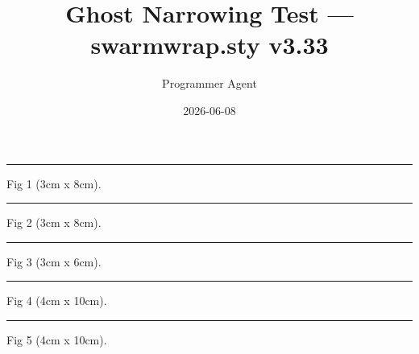 \documentclass[a4paper,11pt]{article}
\title{Ghost Narrowing Test — swarmwrap.sty v3.33}
\author{Programmer Agent}
\date{2026-06-08}
\begin{document}
\maketitle


\begin{swarmwrap}%
  \begin{minipage}[t]{3cm}
    \centering
    \rule{\linewidth}{8cm}
    {\footnotesize Fig 1 (3cm x 8cm).}
  \end{minipage}%
\end{swarmwrap}%
\swarmwrapnext
\lipsum[1]\lipsum[2]\lipsum[3]\lipsum[4]\lipsum[5]

\begin{swarmwrap}%
  \begin{minipage}[t]{3cm}
    \centering
    \rule{\linewidth}{8cm}
    {\footnotesize Fig 2 (3cm x 8cm).}
  \end{minipage}%
\end{swarmwrap}%
\swarmwrapnext
\lipsum[6]\lipsum[7]\lipsum[8]\lipsum[9]\lipsum[10]

\begin{swarmwrap}%
  \begin{minipage}[t]{3cm}
    \centering
    \rule{\linewidth}{6cm}
    {\footnotesize Fig 3 (3cm x 6cm).}
  \end{minipage}%
\end{swarmwrap}%
\swarmwrapnext
\lipsum[11]\lipsum[12]\lipsum[13]\lipsum[14]\lipsum[15]

\begin{swarmwrap}%
  \begin{minipage}[t]{4cm}
    \centering
    \rule{\linewidth}{10cm}
    {\footnotesize Fig 4 (4cm x 10cm).}
  \end{minipage}%
\end{swarmwrap}%
\swarmwrapnext
\lipsum[16]\lipsum[17]\lipsum[18]\lipsum[19]\lipsum[20]

\begin{swarmwrap}%
  \begin{minipage}[t]{4cm}
    \centering
    \rule{\linewidth}{10cm}
    {\footnotesize Fig 5 (4cm x 10cm).}
  \end{minipage}%
\end{swarmwrap}%
\swarmwrapnext
\lipsum[21]\lipsum[22]\lipsum[23]\lipsum[24]\lipsum[25]
\end{document}

